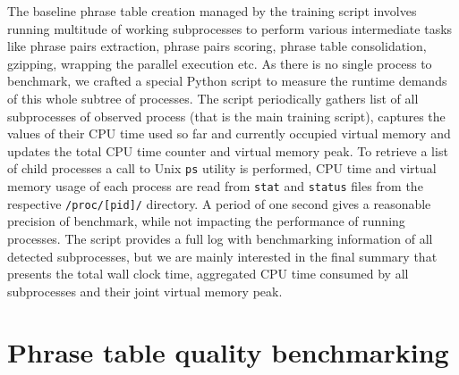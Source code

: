 

The baseline phrase table creation managed by the training script involves
running multitude of working subprocesses to perform various intermediate
tasks like phrase pairs extraction, phrase pairs scoring, phrase table
consolidation, gzipping, wrapping the parallel execution etc.
As there is no single process to benchmark, we crafted a special Python
script to measure the runtime demands of this whole subtree of processes.
The script periodically gathers list of all subprocesses of observed process
(that is the main training script), captures the values of their CPU time
used so far and currently occupied virtual memory and updates the total CPU
time counter and virtual memory peak.
To retrieve a list of child processes a call to Unix \verb|ps| utility is
performed, CPU time and virtual memory usage of each process are read from
\verb|stat| and \verb|status| files from the respective \verb|/proc/[pid]/|
directory.
A period of one second gives a reasonable precision of benchmark, while
not impacting the performance of running processes.
The script provides a full log with benchmarking information of all detected
subprocesses, but we are mainly interested in the final summary that presents
the total wall clock time, aggregated CPU time consumed by all subprocesses
and their joint virtual memory peak.

\section{Phrase table quality benchmarking}

